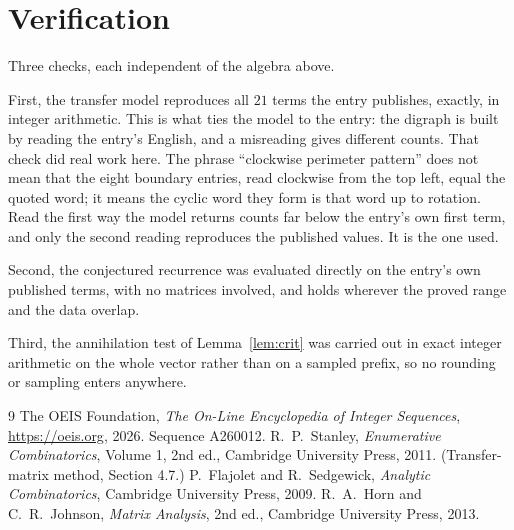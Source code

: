 \documentclass[11pt,a4paper]{article}
\theoremstyle{plain}
\theoremstyle{definition}
\begin{document}
\section{Verification}

Three checks, each independent of the algebra above.

First, the transfer model reproduces all $21$ terms the entry publishes, exactly, in
integer arithmetic. This is what ties the model to the entry: the digraph is built by reading
the entry's English, and a misreading gives different counts. That check did real work here. The phrase ``clockwise perimeter pattern'' does not mean that the eight boundary entries, read clockwise from the top left, equal the quoted word; it means the cyclic word they form is that word up to rotation. Read the first way the model returns counts far below the entry's own first term, and only the second reading reproduces the published values. It is the one used.

Second, the conjectured recurrence was evaluated directly on the entry's own published terms,
with no matrices involved, and holds wherever the proved range and the data overlap.

Third, the annihilation test of Lemma~\ref{lem:crit} was carried out in exact integer
arithmetic on the whole vector rather than on a sampled prefix, so no rounding or sampling
enters anywhere.

\begin{thebibliography}{9}
 The OEIS Foundation, \emph{The On-Line Encyclopedia of Integer
Sequences}, \url{https://oeis.org}, 2026. Sequence A260012.
 R.~P.~Stanley, \emph{Enumerative Combinatorics}, Volume 1, 2nd ed.,
Cambridge University Press, 2011. (Transfer-matrix method, Section 4.7.)
 P.~Flajolet and R.~Sedgewick, \emph{Analytic Combinatorics}, Cambridge
University Press, 2009.
 R.~A.~Horn and C.~R.~Johnson, \emph{Matrix Analysis}, 2nd ed., Cambridge
University Press, 2013.
\end{thebibliography}
\end{document}
